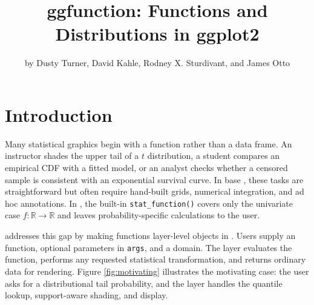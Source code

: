 \title{ggfunction: Functions and Distributions in ggplot2}


\author{by Dusty Turner, David Kahle, Rodney X. Sturdivant, and James Otto}

\maketitle


\section{Introduction}\label{introduction}

Many statistical graphics begin with a function rather than a data frame. An
instructor shades the upper tail of a \(t\) distribution, a student compares an
empirical CDF with a fitted model, or an analyst checks whether a censored
sample is consistent with an exponential survival curve. In base 
\citep{R},
these tasks are straightforward but often require hand-built grids, numerical
integration, and ad hoc annotations. In 
\citep{wickham2010layered, wickham2016ggplot2}, the built-in
\texttt{stat\_function()} covers only the univariate case \(f:\mathbb{R}\to
\mathbb{R}\) and leaves probability-specific calculations to the user.

 addresses this gap by making functions layer-level objects in
. Users supply an  function, optional parameters in
\texttt{args}, and a domain. The layer evaluates the function, performs any
requested statistical transformation, and returns ordinary 
data for rendering. Figure \ref{fig:motivating} illustrates the motivating
case: the user asks for a distributional tail probability, and the layer
handles the quantile lookup, support-aware shading, and 
display.

